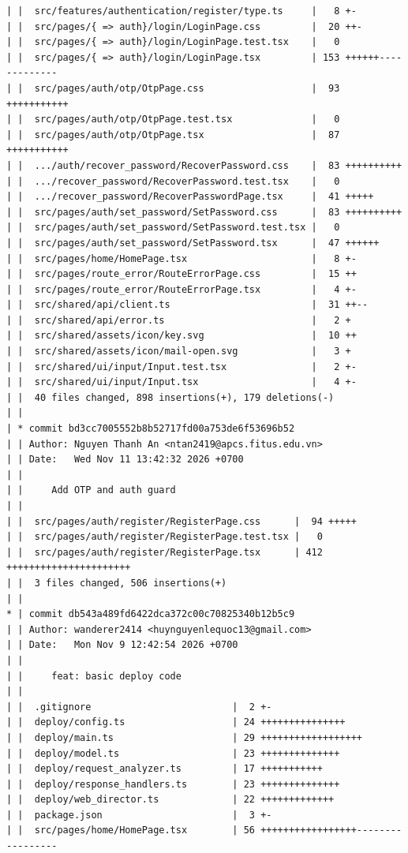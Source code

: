 \documentclass[12pt]{article}
\begin{document}
\begin{lstlisting}[numbers=none,breaklines=true]
| |  src/features/authentication/register/type.ts     |   8 +-
| |  src/pages/{ => auth}/login/LoginPage.css         |  20 ++-
| |  src/pages/{ => auth}/login/LoginPage.test.tsx    |   0
| |  src/pages/{ => auth}/login/LoginPage.tsx         | 153 ++++++-------------
| |  src/pages/auth/otp/OtpPage.css                   |  93 +++++++++++
| |  src/pages/auth/otp/OtpPage.test.tsx              |   0
| |  src/pages/auth/otp/OtpPage.tsx                   |  87 +++++++++++
| |  .../auth/recover_password/RecoverPassword.css    |  83 ++++++++++
| |  .../recover_password/RecoverPassword.test.tsx    |   0
| |  .../recover_password/RecoverPasswordPage.tsx     |  41 +++++
| |  src/pages/auth/set_password/SetPassword.css      |  83 ++++++++++
| |  src/pages/auth/set_password/SetPassword.test.tsx |   0
| |  src/pages/auth/set_password/SetPassword.tsx      |  47 ++++++
| |  src/pages/home/HomePage.tsx                      |   8 +-
| |  src/pages/route_error/RouteErrorPage.css         |  15 ++
| |  src/pages/route_error/RouteErrorPage.tsx         |   4 +-
| |  src/shared/api/client.ts                         |  31 ++--
| |  src/shared/api/error.ts                          |   2 +
| |  src/shared/assets/icon/key.svg                   |  10 ++
| |  src/shared/assets/icon/mail-open.svg             |   3 +
| |  src/shared/ui/input/Input.test.tsx               |   2 +-
| |  src/shared/ui/input/Input.tsx                    |   4 +-
| |  40 files changed, 898 insertions(+), 179 deletions(-)
| |
| * commit bd3cc7005552b8b52717fd00a753de6f53696b52
| | Author: Nguyen Thanh An <ntan2419@apcs.fitus.edu.vn>
| | Date:   Wed Nov 11 13:42:32 2026 +0700
| |
| |     Add OTP and auth guard
| |
| |  src/pages/auth/register/RegisterPage.css      |  94 +++++
| |  src/pages/auth/register/RegisterPage.test.tsx |   0
| |  src/pages/auth/register/RegisterPage.tsx      | 412 ++++++++++++++++++++++
| |  3 files changed, 506 insertions(+)
| |
* | commit db543a489fd6422dca372c00c70825340b12b5c9
| | Author: wanderer2414 <huynguyenlequoc13@gmail.com>
| | Date:   Mon Nov 9 12:42:54 2026 +0700
| |
| |     feat: basic deploy code
| |
| |  .gitignore                         |  2 +-
| |  deploy/config.ts                   | 24 +++++++++++++++
| |  deploy/main.ts                     | 29 ++++++++++++++++++
| |  deploy/model.ts                    | 23 ++++++++++++++
| |  deploy/request_analyzer.ts         | 17 +++++++++++
| |  deploy/response_handlers.ts        | 23 ++++++++++++++
| |  deploy/web_director.ts             | 22 +++++++++++++
| |  package.json                       |  3 +-
| |  src/pages/home/HomePage.tsx        | 56 +++++++++++++++++-----------------

\end{lstlisting}
\end{document}
